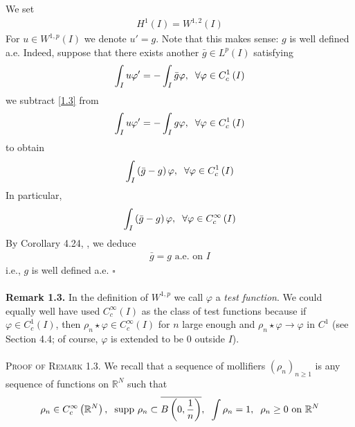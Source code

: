 \documentclass[a4paper,oneside]{article}
\numberwithin{equation}{section}
\begin{document}
We set 
\begin{align}
{H^1}\left( I \right) = {W^{1,2}}\left( I \right)
\end{align}
For $u \in {W^{1,p}}\left( I \right)$ we denote $u'=g$. Note that this makes sense: $g$ is well defined a.e. Indeed, suppose that there exists another $\bar{g} \in L^p\left(I\right)$ satisfying
\begin{align}
\label{1.3}
\int_I {u\varphi '}  =  - \int_I {\bar g\varphi } ,\hspace{0.2cm}\forall \varphi  \in C_c^1\left( I \right)
\end{align}
we subtract \eqref{1.3} from
\begin{align}
\int_I {u\varphi '}  =  - \int_I {g\varphi } ,\hspace{0.2cm}\forall \varphi  \in C_c^1\left( I \right)
\end{align}
to obtain
\begin{align}
\int_I {\left( {\bar g - g} \right)\varphi } ,\hspace{0.2cm}\forall \varphi  \in C_c^1\left( I \right)
\end{align}
In particular, 
\begin{align}
\int_I {\left( {\bar g - g} \right)\varphi } ,\hspace{0.2cm}\forall \varphi  \in C_c^\infty \left( I \right)
\end{align}
By Corollary 4.24, \cite{1}, we deduce 
\begin{align}
\bar{g} =g \mbox{ a.e. on } I 
\end{align}
i.e., $g$ is well defined a.e. \hfill $\square$\\
\\
\textbf{Remark 1.3.} In the definition of $W^{1,p}$ we call  $\varphi$ a \textit{test function}. We could equally well have used $C_c^\infty \left(I\right)$ as the class of test functions because if $\varphi  \in C_c^1\left( I \right)$, then ${\rho _n} \star \varphi  \in C_c^\infty \left( I \right)$ for $n$ large enough and ${\rho _n} \star \varphi  \to \varphi $ in $C^1$ (see \cite{1} Section 4.4; of course, $\varphi$ is extended to be 0 outside $I$).\\
\\
\textsc{Proof of Remark 1.3.} We recall that a sequence of mollifiers ${\left( {{\rho _n}} \right)_{n \ge 1}}$ is any sequence of functions on $\mathbb{R}^N$ such that
\begin{align}
{\rho _n} \in C_c^\infty \left( {{\mathbb{R}^N}} \right),\hspace{0.2cm}\mbox{supp }{\rho _n} \subset \overline {B\left( {0,\frac{1}{n}} \right)} ,\hspace{0.2cm}\int {{\rho _n}}  = 1,\hspace{0.2cm}{\rho _n} \ge 0\mbox{ on }{\mathbb{R}^N}
\end{align}
\end{document}
